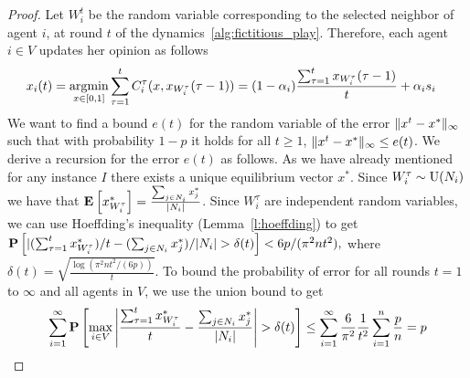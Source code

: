 \begin{proof}
  Let $W_i^t$ be the random variable corresponding to the selected neighbor
  of agent $i$, at round $t$ of the dynamics~\ref{alg:fictitious_play}.
  Therefore, each agent $i \in V$ updates her opinion as follows
  \begin{align*}
    x_i(t)
    &=
    \operatorname*{argmin}_{x \in [0,1]}
    \sum_{\tau=1}^tC^{\tau}_i(x,x_{W_i^{\tau}}(\tau-1))
    =
    (1-\alpha_i)\frac{\sum_{\tau=1}^{t} x_{W_i^\tau}(\tau-1)}{t}
    + \alpha_i s_i
  \end{align*}
  We want to find a bound $e(t)$ for the random variable
  of the error $\| x^t - x^* \|_{\infty}$ such that with probability
  $1-p$ it holds for all $t \geq 1$, $\| x^t - x^* \|_{\infty} \leq e(t)$.
  We derive a recursion for the error $e(t)$ as follows.
  As we have already mentioned for any instance $I$ there exists
  a unique equilibrium vector $x^*$. Since
  $W_i^\tau \sim \mathrm{U}(N_i)$ we have that \(
    \Exp{x^*_{W_i^\tau}} = \frac{\sum_{j \in N_i} x^*_j}{|N_i|}
  \).
  Since $W_i^\tau$ are independent random variables, we can use
  Hoeffding's inequality (Lemma~\ref{l:hoeffding}) to get
  \(
    \bm{\mathrm{P}}\left[
      |
      {(\sum_{\tau = 1}^{t} x^*_{W_i^\tau}})/{t}
      - {(\sum_{j \in N_i} x^*_j)}/{|N_i|}
      > \delta(t)
    \right]
    < 6 p / (\pi^2 n t^2),
  \)
  where $\delta(t) = \sqrt{ \frac{\log(\pi^2 n t^2/(6 p))}{t}}$.
  To bound the probability of error for all rounds $t=1$ to $\infty$
  and all agents in $V$, we use the union bound to get
  \begin{align*}
    \sum_{i=1}^{\infty}
    \bm{\mathrm{P}}\left[ \max_{i \in V}
      \left|
      \frac{\sum_{\tau = 1}^{t} x^*_{W_i^{\tau}}}{t}
      - \frac{\sum_{j \in N_i} x^*_j}{|N_i|} \right|
      > \delta(t)\right]
    \leq
    \sum_{i=1}^{\infty} \frac{6}{\pi^2} \frac{1}{t^2} \sum_{i=1}^n \frac{p}{n} =
    p
  \end{align*}

\end{proof}

